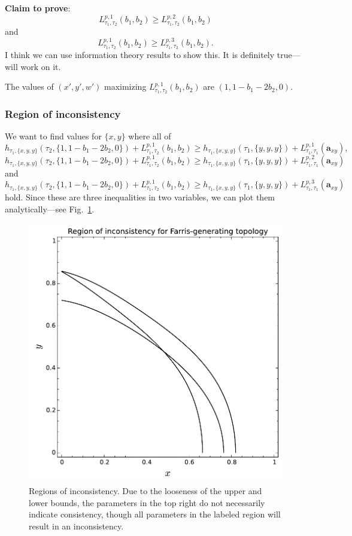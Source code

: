 \documentclass[a4paper]{article}
\begin{document}
\textbf{Claim to prove}:
$$
L^{p,1}_{\tau_1,\tau_2}(b_1, b_2) \ge L^{p,2}_{\tau_1,\tau_2}(b_1, b_2)
$$
and
$$
L^{p,1}_{\tau_1,\tau_2}(b_1, b_2) \ge L^{p,3}_{\tau_1,\tau_2}(b_1, b_2).
$$
I think we can use information theory results to show this.
It is definitely true---will work on it.

The values of $(x', y', w')$ maximizing $L^{p,1}_{\tau_1,\tau_2}(b_1, b_2)$ are $(1, 1-b_1-2b_2,0)$.

\subsubsection{Region of inconsistency}

We want to find values for $\{x,y\}$ where all of
$$
h_{\tau_1,\{x,y,y\}}(\tau_2,\{1, 1-b_{1}-2b_{2}, 0\}) + L^{p,1}_{\tau_1,\tau_2}(b_{1},b_{2}) \ge h_{\tau_1,\{x,y,y\}}(\tau_1,\{y, y, y\}) + L^{p,1}_{\tau_1,\tau_1}(\mathbf{a}_{xy}),
$$
$$
h_{\tau_1,\{x,y,y\}}(\tau_2,\{1, 1-b_{1}-2b_{2}, 0\}) + L^{p,1}_{\tau_1,\tau_2}(b_{1},b_{2}) \ge h_{\tau_1,\{x,y,y\}}(\tau_1,\{y, y, y\}) + L^{p,2}_{\tau_1,\tau_1}(\mathbf{a}_{xy})
$$
and
$$
h_{\tau_1,\{x,y,y\}}(\tau_2,\{1, 1-b_{1}-2b_{2}, 0\}) + L^{p,1}_{\tau_1,\tau_2}(b_{1},b_{2}) \ge h_{\tau_1,\{x,y,y\}}(\tau_1,\{y, y, y\}) + L^{p,3}_{\tau_1,\tau_1}(\mathbf{a}_{xy})
$$
hold.
Since these are three inequalities in two variables, we can plot them analytically---see Fig.~\ref{fig:inconsistency-farris}.

\begin{figure}
\centering
\includegraphics[width=.9\textwidth]{analytic-inconsistency}
\caption{
    Regions of inconsistency.
    Due to the looseness of the upper and lower bounds, the parameters in the top right do not necessarily indicate consistency, though all parameters in the labeled region will result in an inconsistency.
}
\label{fig:inconsistency-farris}
\end{figure}
\end{document}
